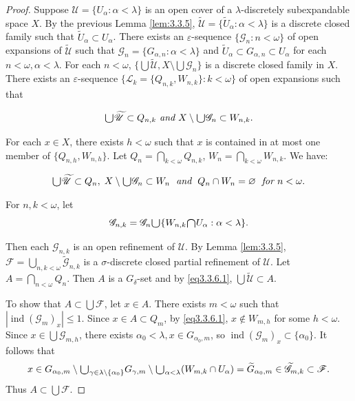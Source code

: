 \documentclass[ch3.tex]{subfiles}
\begin{document}
\begin{proof} Suppose $\mathscr{U} = \{U_\alpha:  \alpha < \lambda\}$ is an 
open cover of a $\lambda$-discretely subexpandable space $X$. 
By the previous Lemma \ref{lem:3.3.5}, $\widetilde{\mathscr{U}} = \{\widetilde{U}_\alpha:  \alpha < \lambda\}$ 
is a discrete closed family such that $\widetilde{U}_\alpha \subset U_\alpha$. 
There exists an $\varepsilon$-sequence 
$\{\mathscr{G}_n: n < \omega\}$ 
of open expansions of $\widetilde{\mathscr{U}}$ such that 
$\mathscr{G}_n = \{G_{\alpha,n}: \alpha < \lambda\}$ and
$\widetilde{U}_\alpha \subset G_{\alpha,n} \subset U_\alpha$ for each $n<\omega,\alpha < \lambda$.
For each $n < \omega$, $\{\bigcup \widetilde{\mathscr{U}}, X \setminus \bigcup \mathscr{G}_n\}$ is a discrete closed family in $X$. There exists an $\varepsilon$-sequence 
$\{\mathscr{L}_k = \{Q_{n,k}, W_{n,k}\}: k < \omega\}$ of open expansions such that 

$$\raisebox{-2pt}{\scalebox{1.5}{$\cup$}} \widetilde{\mathscr{U}} \subset Q_{n,k} \textit{ and }
X \setminus \raisebox{-2pt}{\scalebox{1.5}{$\cup$}} \mathscr{G}_n \subset W_{n,k}.$$

\noindent For each $x \in X$, there exists $h < \omega$ such that $x$ is contained in 
at most one member of $\{Q_{n, h}, W_{n, h}\}$. 
Let $Q_n = \bigcap_{k < \omega} Q_{n,k}$, $W_n = \bigcap_{k < \omega} W_{n,k}$. We have:

\begin{gather}
\raisebox{-2pt}{\scalebox{1.5}{$\cup$}} \widetilde{\mathscr{U}} \subset Q_n, \;
X \setminus \raisebox{-2pt}{\scalebox{1.5}{$\cup$}} \mathscr{G}_n \subset W_n \; \textit{ and } \;
Q_n \cap W_n = \varnothing \;
 \textit{ for } n < \omega.        \label{eq3.3.6.1}
\end{gather}

\noindent For $n, k < \omega$, let 
$$\mathscr{G}_{n,k} = \mathscr{G}_n \raisebox{-2pt}{\scalebox{1.5}{$\cup$}} \{W_{n,k} 
\raisebox{-2pt}{\scalebox{1.5}{$\cap$}} U_\alpha:  \alpha < \lambda\}.$$ 

\noindent Then each $\mathscr{G}_{n,k}$ is an open refinement of $\mathscr{U}$. 
By Lemma \ref{lem:3.3.5}, $\mathscr{F} = \bigcup_{n,k < \omega} \widetilde{\mathscr{G}}_{n,k}$ is a $\sigma$-discrete closed partial refinement of $\mathscr{U}$. 
Let $A = \bigcap_{n < \omega} Q_n$. Then $A$ is a $G_\delta$-set and by \eqref{eq3.3.6.1}, 
$\bigcup \widetilde{\mathscr{U}} \subset A$.

To show that $A\subset \bigcup\mathscr{F}$, let $x \in A$. 
There exists $m < \omega$ such that $|\operatorname{ind}(\mathscr{G}_m)_x| \le 1$.
Since $x \in A \subset Q_m$, by \eqref{eq3.3.6.1}, $x \notin W_{m, h}$ for some $h < \omega$. 
Since $x \in \bigcup\mathscr{G}_{m,h}$, there exists $\alpha_0 < \lambda, x\in G_{\alpha_0, m}$, so
$\operatorname{ind}(\mathscr{G}_m)_x\subset \{\alpha_0\}$. It follows that
$$x \in G_{\alpha_0, m} \setminus \raisebox{-2pt}{\scalebox{1.5}{$\cup$}}_{\gamma \in\lambda\setminus \{\alpha_0\}} G_{\gamma, m} \setminus \raisebox{-2pt}{\scalebox{1.5}{$\cup$}}_{\alpha < \lambda} (W_{m,k} \cap U_\alpha) = 
\widetilde{G}_{\alpha_0, m} \in \widetilde{\mathscr{G}}_{m,k} \subset \mathscr{F}.$$
Thus $A \subset \bigcup \mathscr{F}$.
\end{proof} 
\end{document}
